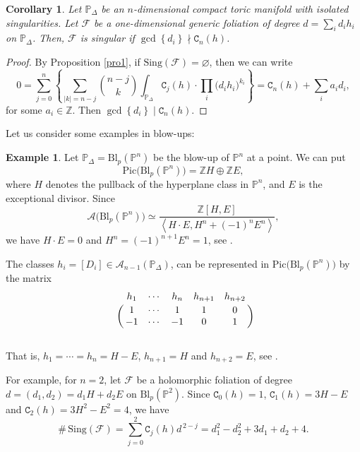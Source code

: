 \documentclass[11pt]{amsart}
\theoremstyle{plain}
\newtheorem{cor}{Corollary}[section]
\theoremstyle{definition}
\newtheorem{exe}{Example}[section]
\begin{document}
\begin{cor} Let $\mathbb{P}_{\Delta}$ be an $n$-dimensional compact toric manifold with isolated singularities.
Let $\mathcal{F}$ be a one-dimensional generic foliation of degree $d=\sum_{i}d_{i} h_i$ on $\mathbb{P}_{\Delta}$. 
Then, $\mathcal{F}$ is singular if $\gcd\left\{d_i\right\} \nmid \texttt{C}_n(h)$.
\end{cor}
\begin{proof}
By Proposition \ref{pro1}, if $\mathrm{Sing}\left(\mathcal{F}\right)=\varnothing$, then we can write
$$0=\sum_{j=0}^{n}\left\{\sum_{\left|k\right|=n-j}\binom{n-j}{k}
\int_{\mathbb{P}_{\Delta}} \texttt{C}_j(h)\cdot \prod_i \big(d_i h_i\big)^{k_i}\right\} 
=\texttt{C}_n(h) + \sum_{i}a_i d_i,$$
for some $a_i\in\mathbb{Z}$. Then $\gcd\left\{d_i\right\} \mid \texttt{C}_n(h)$.
\end{proof}

Let us consider some examples in blow-ups:

\begin{exe} Let $\mathbb{P}_{\Delta}=\mathrm{Bl}_p(\mathbb{P}^n)$ be the blow-up of 
$\mathbb{P}^n$ at a point. We can put 
$$\mathrm{Pic}\big(\mathrm{Bl}_p(\mathbb{P}^n)\big)=\mathbb{Z}H\oplus\mathbb{Z}E,$$ 
where $H$ denotes the pullback of the hyperplane class in $\mathbb{P}^n$, and $E$ is the exceptional divisor. 
Since 
$$\mathcal{A}\big(\mathrm{Bl}_p(\mathbb{P}^n)\big)\simeq\frac{\mathbb{Z}\left[H,E\right]}
{\left\langle H\cdot E,H^n+(-1)^nE^n\right\rangle},$$
we have $H\cdot E=0$ and $H^n=(-1)^{n+1}E^n=1$, see \cite{EiHa}. 

The classes $h_i=\left[D_i\right]\in\mathcal{A}_{n-1}(\mathbb{P}_{\Delta})$, 
can be represented in $\mathrm{Pic}\big(\mathrm{Bl}_p(\mathbb{P}^n)\big)$ by the matrix
$$\bordermatrix{& h_1 & \cdots & h_n & h_{n+1} & h_{n+2} \cr
                &  1  & \cdots &  1  &    1    & 0  \cr
                &  -1  & \cdots &  -1  &    0    & 1 \cr}$$
\\								
\noindent That is, $h_1=\cdots=h_n=H-E$, $h_{n+1}=H$ and $h_{n+2}=E$, see \cite{Cox2, MaA}. 

For example, for $n=2$, let $\mathcal{F}$ be a holomorphic foliation of degree $d=(d_1,d_2)=d_1H+d_2E$ on $\mathrm{Bl}_p(\mathbb{P}^2)$.
Since $\texttt{C}_0(h)=1$, $\texttt{C}_1(h)=3H-E$ and $\texttt{C}_2(h)=3H^2-E^2=4$, we have
$$\#\,\mathrm{Sing}(\mathcal{F})=\sum_{j=0}^2\texttt{C}_j(h)d^{\,2-j}=d_1^2-d_2^2+3d_1+d_2+4.$$
\end{exe}
\end{document}
